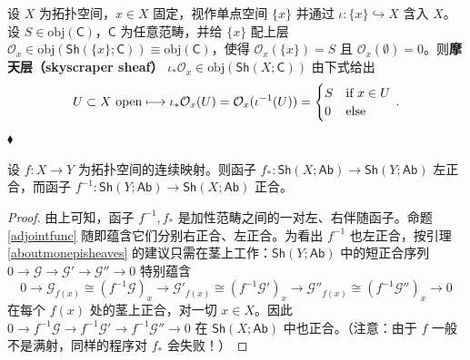 \begin{Ex}\label{skyscrapersheaf}
设 $X$ 为拓扑空间，$x\in X$ 固定，视作单点空间 $\{x\}$ 并通过 $\iota:\{x\}\hookrightarrow X$ 含入 $X$。设 $S\in\text{obj}(\mathsf{C})$，$\mathsf{C}$ 为任意范畴，并给 $\{x\}$ 配上层 $\mathcal{O}_x\in\text{obj}(\mathsf{Sh}(\{x\};\mathsf{C}))\equiv\text{obj}(\mathsf{C})$，使得 $\mathcal{O}_x(\{x\})=S$ 且 $\mathcal{O}_x(\emptyset)=0$。则\textbf{摩天层（skyscraper sheaf）} $\iota_*\mathcal{O}_x\in\text{obj}(\mathsf{Sh}(X;\mathsf{C}))$ 由下式给出
\vspace*{-0.2cm}
\begin{equation}
	U\subset X\text{ open}\longmapsto\iota_*\mathcal{O}_x(U)=\mathcal{O}_x(\iota^{-1}(U))= 
	\begin{cases}
		S & $if $ x\in U \\ 
		0 & $else $
	\end{cases}\,. 
	\vspace*{-0.4cm} 
\end{equation}
\hfill $\blacklozenge$
\end{Ex}

\begin{Lem}\label{inversepushforwardexact}
设 $f:X\rightarrow Y$ 为拓扑空间的连续映射。则函子 $f_*:\mathsf{Sh}(X;\mathsf{Ab})\rightarrow\mathsf{Sh}(Y;\mathsf{Ab})$ 左正合，而函子 $f^{-1}:\mathsf{Sh}(Y;\mathsf{Ab})\rightarrow\mathsf{Sh}(X;\mathsf{Ab})$ 正合。
\end{Lem}

\begin{proof}
由上可知，函子 $f^{-1}, f_*$ 是加性范畴之间的一对左、右伴随函子。命题 \ref{adjointfunc} 随即蕴含它们分别右正合、左正合。为看出 $f^{-1}$ 也左正合，按引理 \ref{aboutmonepisheaves} 的建议只需在茎上工作：$\mathsf{Sh}(Y;\mathsf{Ab})$ 中的短正合序列 $0\rightarrow\mathcal{G}\rightarrow\mathcal{G}'\rightarrow\mathcal{G}''\rightarrow 0$ 特别蕴含
\[
0\rightarrow\mathcal{G}_{f(x)}\cong(f^{-1}\mathcal{G})_x\rightarrow\mathcal{G'}_{f(x)}\cong(f^{-1}\mathcal{G'})_x\rightarrow\mathcal{G''}_{f(x)}\cong(f^{-1}\mathcal{G''})_x\rightarrow 0 
\]
在每个 $f(x)$ 处的茎上正合，对一切 $x\in X$。因此 $0\rightarrow f^{-1}\mathcal{G}\rightarrow f^{-1}\mathcal{G'}\rightarrow f^{-1}\mathcal{G''}\rightarrow 0$ 在 $\mathsf{Sh}(X;\mathsf{Ab})$ 中也正合。（注意：由于 $f$ 一般不是满射，同样的程序对 $f_*$ 会失败！）
\end{proof}

